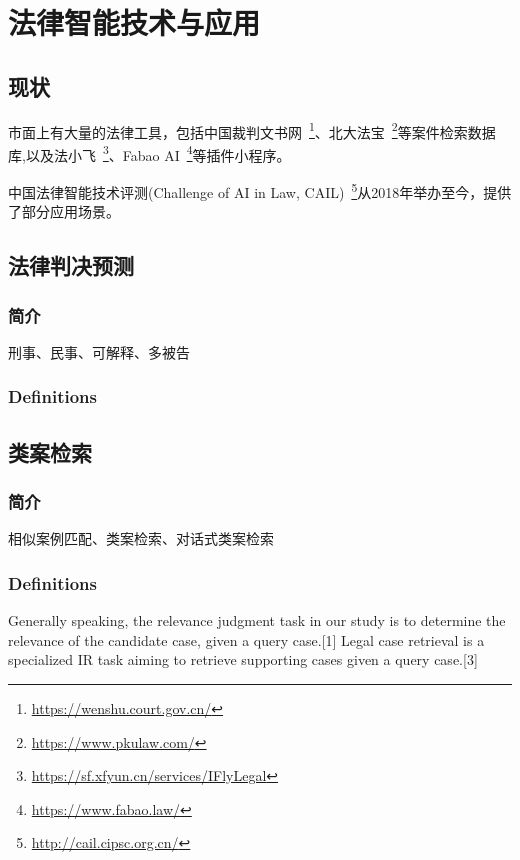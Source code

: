 \documentclass[lang=en,12pt]{beautybook}
\begin{document}
\part{法律智能技术与应用}

\chapter{现状}
市面上有大量的法律工具，包括中国裁判文书网~\footnote{\url{https://wenshu.court.gov.cn/}}、北大法宝~\footnote{\url{https://www.pkulaw.com/}}等案件检索数据库,以及法小飞~\footnote{\url{https://sf.xfyun.cn/services/IFlyLegal}}、Fabao AI~\footnote{\url{https://www.fabao.law/}}等插件小程序。

中国法律智能技术评测(Challenge of AI in Law, CAIL)~\footnote{\url{http://cail.cipsc.org.cn/}}从2018年举办至今，提供了部分应用场景。

\chapter{法律判决预测}

\section{简介}
刑事、民事、可解释、多被告

\section{Definitions}

\chapter{类案检索}

\section{简介}
相似案例匹配、类案检索、对话式类案检索

\section{Definitions}
Generally speaking, the relevance judgment task in our study is to determine the relevance of the candidate case, given a query case.[1]
Legal case retrieval is a specialized IR task aiming to retrieve supporting cases given a query case.[3]
\end{document}
